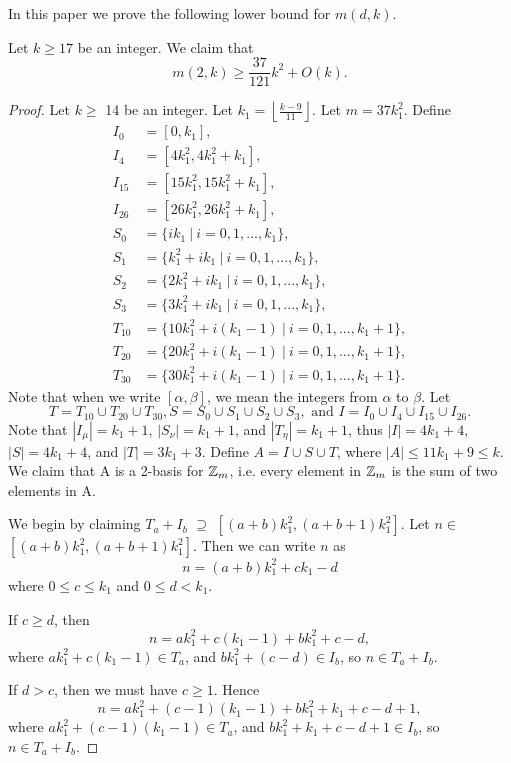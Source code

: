  
In this paper we prove the following lower bound for $m(d, k)$.
\begin{theorem}
Let $k \geq 17$ be an integer. We claim that
 \[
m(2,k) \geq \frac{37}{121}k^2 + O(k). 
\]
\end{theorem}
\begin{proof}
Let $k \geq$ 14 be an integer. Let $k_1 = \left \lfloor \frac{k - 9}{11} \right \rfloor$. Let $m = 37k_1^2$.  Define 
\begin{align*}
I_0 &= [0, k_1], \\
I_4 &= [4k_1^2, 4k_1^2+k_1], \\
I_{15} &= [15k_1^2, 15k_1^2+k_1],\\
I_{26} &= [26k_1^2, 26k_1^2+k_1], \\
S_0 &= \{ik_1 \ |\  i = 0 , 1, ... , k_1\},\\
S_1 &= \{k_1^2 + ik_1 \ |\  i = 0 , 1, ... , k_1\},\\
S_2 &= \{2k_1^2 + ik_1 \ |\  i = 0 , 1, ... , k_1\}, \\
S_3 &= \{3k_1^2 +ik_1 \ |\   i = 0 , 1, ... , k_1\}, \\
T_{10} &= \{10k_1^2+ i(k_1 - 1) \ |\   i = 0 , 1, ... , k_1 + 1\},\\
T_{20} &= \{20k_1^2 + i(k_1 - 1) \ |\  i = 0 , 1, ... , k_1 + 1\}, \\
T_{30} &= \{30k_1^2 + i(k_1 - 1) \ |\  i = 0 , 1, ... , k_1 + 1\}.
\end{align*}
Note that when we write $[\alpha, \beta]$, we mean the integers from $\alpha$ to $\beta$. Let \[
T = T_{10} \cup T_{20} \cup T_{30},
 S = S_{0} \cup S_{1} \cup S_{2} \cup S_{3}, \text{ and } 
I = I_{0} \cup I_{4} \cup I_{15} \cup I_{26}.\] 
Note that $|I_\mu| = k_1 + 1$, $|S_\nu| = k_1 + 1$, and $|T_\eta| = k_1 + 1$, thus $|I| = 4k_1 + 4$, $|S| = 4k_1 + 4$, and $|T| = 3k_1 + 3$. Define $A = I \cup S \cup T$, where $|A| \leq 11k_1 + 9 \leq k$.  We claim that A is a 2-basis for $\mbox{$\mathbb Z$}_m$, i.e. every element in $\mbox{$\mathbb Z$}_m$ is the sum of two elements in A.

We begin by claiming $T_a + I_b$ $\supseteq$ $[(a + b)k_1^2 ,  (a + b + 1)k_1^2]$. Let $n \in$ $[(a + b)k_1^2 ,  (a + b + 1)k_1^2]$.
Then we can write $n$ as 
\[
n = (a + b) k_1^2 + ck_1 - d
\]
where $0 \leq c \leq k_1$ and $0 \leq d < k_1$.

If $c \geq d$, then
\[
n = ak_1^2 + c(k_1- 1) + bk_1^2 +  c - d,
\]
where $ak_1^2 +c(k_1- 1) \in T_a$, and $bk_1^2 + (c - d) \in I_b$, so $n \in T_a + I_b$. 

If $d>c$, then we must have $c \geq 1$. Hence
\[
n = ak_1^2 + (c - 1)(k_1 - 1) + bk_1^2 + k_1 +c - d + 1, 
\]
where $ak_1^2 + (c - 1)(k_1 - 1) \in T_a$, and $bk_1^2 + k_1 + c - d + 1 \in I_b$, so $n \in T_a + I_b$. 


\end{proof}
